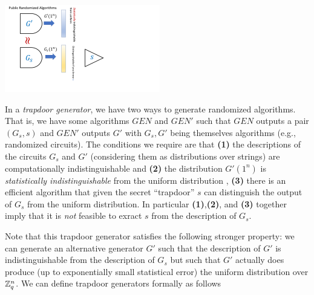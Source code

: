 \begin{marginfigure}
\centering
\includegraphics[width=\linewidth, height=1.5in, keepaspectratio]{../figure/trapdoorprg.png}
\caption{In a \emph{trapdoor generator}, we have two ways to generate
randomized algorithms. That is, we have some algorithms
\(\ensuremath{\mathit{GEN}}\) and \(\ensuremath{\mathit{GEN}}'\) such
that \(\ensuremath{\mathit{GEN}}\) outputs a pair \((G_s,s)\) and
\(\ensuremath{\mathit{GEN}}'\) outputs \(G'\) with \(G_s,G'\) being
themselves algorithms (e.g., randomized circuits). The conditions we
require are that \textbf{(1)} the descriptions of the circuits \(G_s\)
and \(G'\) (considering them as distributions over strings) are
computationally indistinguishable and \textbf{(2)} the distribution
\(G'(1^n)\) is \emph{statistically indistinguishable} from the uniform
distribution , \textbf{(3)} there is an efficient algorithm that given
the secret ``trapdoor'' \(s\) can distinguish the output of \(G_s\) from
the uniform distribution. In particular \textbf{(1)},\textbf{(2)}, and
\textbf{(3)} together imply that it is \emph{not} feasible to exract
\(s\) from the description of \(G_s\).}
\label{TDPgenfig}
\end{marginfigure}

Note that this trapdoor generator satisfies the following stronger
property: we can generate an alternative generator \(G'\) such that the
description of \(G'\) is indistinguishable from the description of
\(G_s\) but such that \(G'\) actually does produce (up to exponentially
small statistical error) the uniform distribution over \({\mathbb{Z}}_q^n\). We
can define trapdoor generators formally as follows

